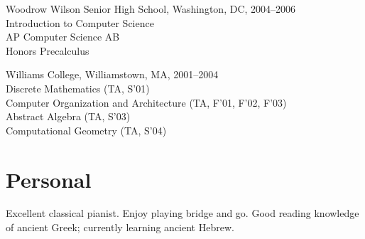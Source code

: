 \documentclass{article}
\newcommand{\cvitem}{\par\hangpara{2em}{1}}
\begin{document}
\cvitem
Woodrow Wilson Senior High School, Washington, DC, 2004--2006 \\
Introduction to Computer Science \\
AP Computer Science AB \\
Honors Precalculus

\cvitem
Williams College, Williamstown, MA, 2001--2004 \\
Discrete Mathematics (TA, S'01) \\
Computer Organization and Architecture (TA, F'01, F'02, F'03) \\
Abstract Algebra (TA, S'03) \\
Computational Geometry (TA, S'04) \\

\section*{Personal}

Excellent classical pianist.  Enjoy playing bridge and go.  Good
reading knowledge of ancient Greek; currently learning ancient
Hebrew.
\end{document}
